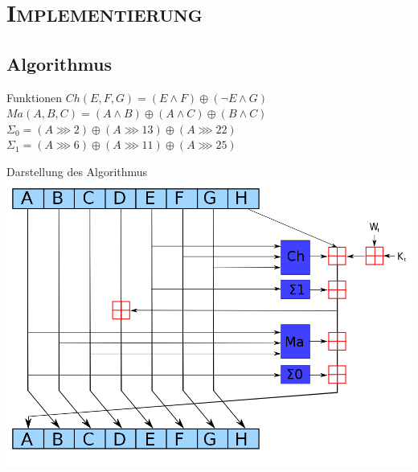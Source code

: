 \documentclass[xcolor=x11names,compress]{beamer}
\renewcommand{\(}{\begin{columns}}
\renewcommand{\)}{\end{columns}}
\newcommand{\<}[1]{\begin{column}{#1}}
\renewcommand{\>}{\end{column}}
\begin{document}
\section{\scshape Implementierung}
\subsection{Algorithmus}
\begin{frame}{Funktionen}
$ Ch(E,F,G) = (E\wedge F) \oplus (\neg E\wedge G)$
$ Ma(A,B,C) = (A\wedge B) \oplus (A\wedge C) \oplus (B\wedge C)$\\
$ \Sigma_0 = (A\ggg 2) \oplus (A\ggg 13) \oplus (A\ggg 22) $\\
$ \Sigma_1 = (A\ggg 6) \oplus (A\ggg 11) \oplus (A\ggg 25) $\\
\end{frame}


\begin{frame}{Darstellung des Algorithmus}
\includegraphics[scale=0.3]{sha256.png}\\
\end{frame}


\end{document}

